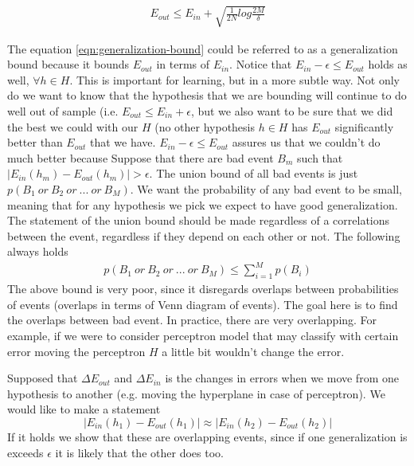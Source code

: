 \documentclass[class=article, crop=false]{standalone}
\numberwithin{equation}{section}
\begin{document}
\begin{align}
    E_{out}\leq E_{in}+\sqrt{\frac{1}{2N}log\frac{2M}{\delta}}
\end{align}\label{eqn:generalization-bound}

The equation \ref{eqn:generalization-bound} could be referred to as a generalization bound because it bounds $E_{out}$ in terms of $E_{in}$. Notice that $E_{in}-\epsilon\leq E_{out}$ holds as well, $\forall h\in H$. This is important for learning, but in a more subtle way. Not only do we want to know that the hypothesis that we are bounding will continue to do well out of sample (i.e. $E_{out}\leq E_{in} + \epsilon$, but we also want to be sure that we did the best we could with our $H$ (no other hypothesis $h\in H$ has $E_{out}$ significantly better than $E_{out}$ that we have. $E_{in}-\epsilon\leq E_{out}$ assures us that we couldn't do much better because   
Suppose that there are bad event $B_m$ such that $|E_{in}(h_m)-E_{out}(h_m)|>\epsilon$. The union bound of all bad events is just $p(B_1 \ or\  B_2 \ or\  ... \ or\  B_M)$. We want the probability of any bad event to be small, meaning that for any hypothesis we pick we expect to have good generalization. The statement of the union bound should be made regardless of a correlations between the event, regardless if they depend on each other or not. The following always holds
\begin{align}
    p(B_1 \ or\  B_2 \ or\  ... \ or\  B_M)\leq \sum \limits_{i=1}^Mp(B_i)
\end{align}
The above bound is very poor, since it disregards overlaps between probabilities of events (overlaps in terms of Venn diagram of events). The goal here is to find the overlaps between bad event. In practice, there are very overlapping. For example, if we were to consider perceptron model that may classify with certain error moving the perceptron $H$ a little bit wouldn't change the error.

Supposed that $\Delta E_{out}$ and $\Delta E_{in}$ is the changes in errors when we move from one hypothesis to another (e.g. moving the hyperplane in case of perceptron). We would like to make a statement 
$$ |E_{in}(h_1)-E_{out}(h_1)|\approx |E_{in}(h_2)-E_{out}(h_2)| $$
If it holds we show that these are overlapping events, since if one generalization is exceeds $\epsilon$ it is likely that the other does too. 
\end{document}
